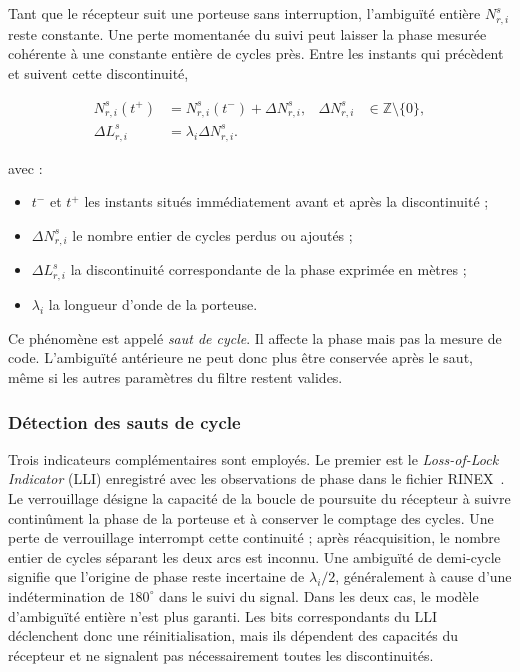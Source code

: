 Tant que le récepteur suit une porteuse sans interruption, l'ambiguïté entière
$N_{r,i}^s$ reste constante. Une perte momentanée du suivi peut laisser la
phase mesurée cohérente à une constante entière de cycles près. Entre les
instants qui précèdent et suivent cette discontinuité,

\begin{align}
N_{r,i}^s(t^+)
&=
N_{r,i}^s(t^-)+\Delta N_{r,i}^s,
&
\Delta N_{r,i}^s
&\in\mathbb Z\setminus\{0\},
\\
\Delta L_{r,i}^s
&=
\lambda_i\Delta N_{r,i}^s.
\label{ann:eq:cycle_slip_definition}
\end{align}

avec :

\begin{itemize}
    \item $t^-$ et $t^+$ les instants situés immédiatement avant et après la
    discontinuité ;
    \item $\Delta N_{r,i}^s$ le nombre entier de cycles perdus ou ajoutés ;
    \item $\Delta L_{r,i}^s$ la discontinuité correspondante de la phase
    exprimée en mètres ;
    \item $\lambda_i$ la longueur d'onde de la porteuse.
\end{itemize}

Ce phénomène est appelé \emph{saut de cycle}. Il affecte la phase mais pas la
mesure de code. L'ambiguïté antérieure ne peut donc plus être conservée après
le saut, même si les autres paramètres du filtre restent valides.

\subsubsection{Détection des sauts de cycle}

Trois indicateurs complémentaires sont employés. Le premier est le
\textit{Loss-of-Lock Indicator} (LLI) enregistré avec les observations de
phase dans le fichier RINEX~\cite{rinex304}. Le verrouillage désigne la capacité de la boucle
de poursuite du récepteur à suivre continûment la phase de la porteuse et à
conserver le comptage des cycles. Une perte de verrouillage interrompt cette
continuité ; après réacquisition, le nombre entier de cycles séparant les deux
arcs est inconnu. Une ambiguïté de demi-cycle signifie que l'origine de phase
reste incertaine de $\lambda_i/2$, généralement à cause d'une indétermination
de $180^\circ$ dans le suivi du signal. Dans les deux cas, le modèle
d'ambiguïté entière n'est plus garanti. Les bits correspondants du LLI
déclenchent donc une réinitialisation, mais ils dépendent des capacités du
récepteur et ne signalent pas nécessairement toutes les discontinuités.

